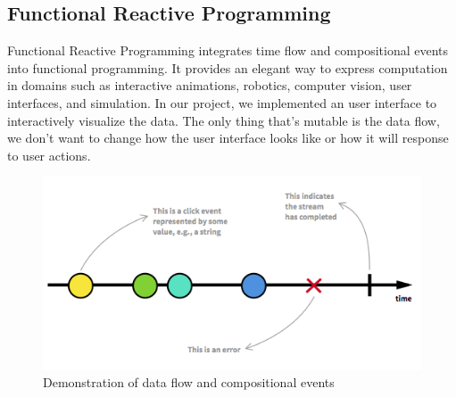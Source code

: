 \subsection{Functional Reactive Programming}

Functional Reactive Programming integrates time flow and compositional events into functional programming. It provides an elegant way to express computation in domains such as interactive animations, robotics, computer vision, user interfaces, and simulation. In our project, we implemented an user interface to interactively visualize the data. The only thing that's mutable is the data flow, we don't want to change how the user interface looks like or how it will response to user actions.

\begin{figure}[h]
\centering
		\includegraphics[width=\linewidth]{figure/frp_demo}
	\caption{Demonstration of data flow and compositional events}
	\label{fig:frp_demo}
\end{figure}




